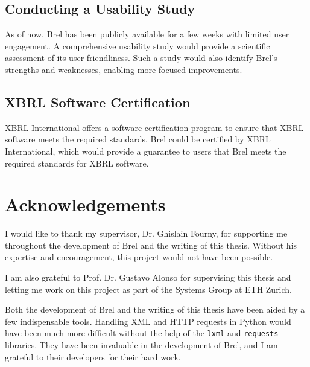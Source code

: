 \subsection{Conducting a Usability Study}

As of now, Brel has been publicly available for a few weeks with limited user engagement.
A \textcolor{airforceblue}{comprehensive usability study} would provide a scientific assessment of its user-friendliness.
Such a study would also identify Brel's strengths and weaknesses, enabling more focused improvements.

\subsection{XBRL Software Certification}

XBRL International offers a software certification program to ensure that XBRL software meets the required standards\cite{xbrl_certified_software}.
Brel could be 
\textcolor{airforceblue}{certified by XBRL International}, which would provide a guarantee to users that Brel meets the required standards for XBRL software.


\pagebreak
\section{Acknowledgements}

I would like to thank my supervisor, Dr. Ghislain Fourny, 
for supporting me throughout the development of Brel and the writing of this thesis.
Without his expertise and encouragement, this project would not have been possible.

I am also grateful to Prof. Dr. Gustavo Alonso for supervising this thesis and letting me work on this project
as part of the Systems Group at ETH Zurich.

Both the development of Brel and the writing of this thesis have been aided by a few indispensable tools.
Handling XML and HTTP requests in Python would have been much more difficult without the help of the \texttt{lxml} and \texttt{requests} libraries.
They have been invaluable in the development of Brel, and I am grateful to their developers for their hard work.

